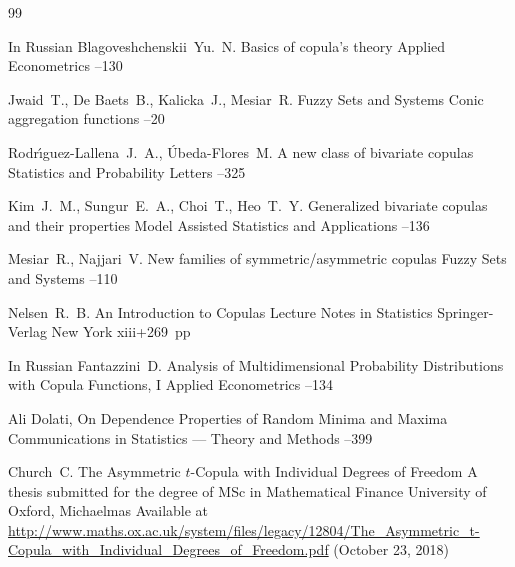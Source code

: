 \begin{thebibliography}{99}  %

\lang In Russian
\by Blagoveshchenskii~Yu.~N.
\paper Basics of copula's theory
\jour  Applied Econometrics
--130 



\by Jwaid~T., De Baets~B., Kalicka~J., Mesiar~R.
\jour Fuzzy Sets and Systems
\paper Conic aggregation functions
–20 

\by Rodr\'{\i}guez-Lallena~J.~A., \'Ubeda-Flores~M. 
\paper A new class of bivariate copulas
\jour Statistics and Probability Letters
--325 



\by Kim~J.~M., Sungur~E.~A., Choi~T., Heo~T.~Y.
\paper Generalized bivariate copulas and their properties
\jour Model Assisted Statistics and Applications
--136

\by Mesiar~R., Najjari~V.
\paper New families of symmetric/asymmetric copulas
\jour Fuzzy Sets and Systems 
–110 

\by Nelsen~R.~B. 
\book An Introduction to Copulas
\serial Lecture Notes in Statistics
\publ Springer-Verlag
\publaddr New York
\totalpages xiii+269~pp \nofrills
{}


\lang In Russian
\by Fantazzini~D. 
\paper Analysis of Multidimensional Probability Distributions with Copula Functions,  I
\jour Applied Econometrics
--134 



\by  Ali Dolati,  
\paper On Dependence Properties of Random Minima and Maxima
\jour Communications in Statistics --- Theory and Methods  
--399 


\by Church~C.
\thesis The Asymmetric $t$-Copula with Individual Degrees of Freedom
\thesisinfo A thesis submitted for the degree of MSc in Mathematical Finance
\publaddr University of Oxford, Michaelmas 
\elink Available at \url{http://www.maths.ox.ac.uk/system/files/legacy/12804/The_Asymmetric_t-Copula_with_Individual_Degrees_of_Freedom.pdf} (October 23, 2018) 


\end{thebibliography}
